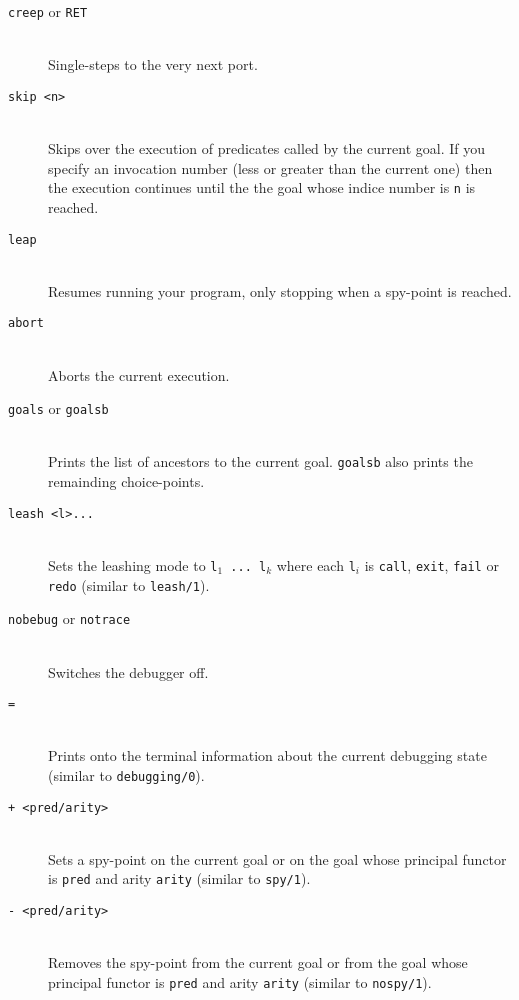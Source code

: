 \begin{description}

\item [{\tt creep} or {\tt RET}]~\\
	Single-steps to the very next port.

\item [{\tt skip <n>}]~\\
	Skips over the execution of predicates called by the current
	goal. If you specify an invocation number (less or greater
	than the current one) then the execution continues until the
	the goal whose indice number is {\tt n} is reached.

\item [{\tt leap}]~\\
	Resumes running your program, only
	stopping when a spy-point is reached.


\item [{\tt abort}]~\\
	Aborts the current execution.

\item [{\tt goals} or {\tt goalsb}]~\\
	Prints the list of ancestors to the current goal. {\tt goalsb}
	also prints the remainding choice-points.

\item [{\tt leash <l>...}]~\\
	Sets the leashing mode to {\tt l$_1$ ... l$_k$} where each
	{\tt l$_i$} is {\tt call}, {\tt exit}, {\tt fail} or {\tt redo}
	(similar to {\tt leash/1}).

\item [{\tt nobebug} or {\tt notrace}]~\\
	Switches the debugger off. 

\item [{\tt =}]~\\
	Prints onto the terminal information about the current
	debugging state (similar to {\tt debugging/0}).


\item [{\tt + <pred/arity>}]~\\
	Sets a spy-point on the current goal or on the goal whose
	principal functor is {\tt pred} and arity {\tt arity} (similar
	to {\tt spy/1}).

\item [{\tt - <pred/arity>}]~\\
	Removes the spy-point from the current goal or from the goal whose
	principal functor is {\tt pred} and arity {\tt arity} (similar
	to {\tt nospy/1}).


\end{description}
